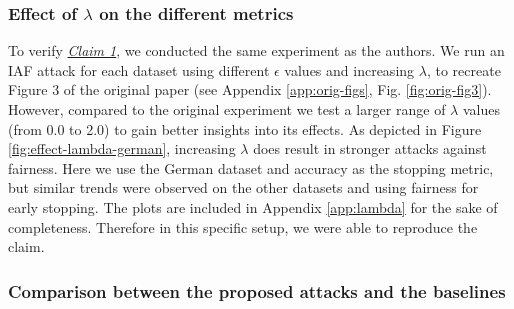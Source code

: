 \subsubsection{Effect of $\lambda$ on the different metrics}
\label{sec:lambda}
To verify \hyperlink{claim-1}{\textit{Claim 1}}, we conducted the same experiment as the authors. We run an IAF attack for each dataset using different $\epsilon$ values and increasing $\lambda$, to recreate Figure 3 of the original paper (see Appendix \ref{app:orig-figs}, Fig. \ref{fig:orig-fig3}). However, compared to the original experiment we test a larger range of $\lambda$ values (from 0.0 to 2.0) to gain better insights into its effects. As depicted in Figure \ref{fig:effect-lambda-german}, increasing $\lambda$ does result in stronger attacks against fairness. Here we use the German dataset and accuracy as the stopping metric, but similar trends were observed on the other datasets and using fairness for early stopping. The plots are included in Appendix \ref{app:lambda} for the sake of completeness. Therefore in this specific setup, we were able to reproduce the claim.

\subsubsection{Comparison between the proposed attacks and the baselines}\label{sec:results-comparison}

